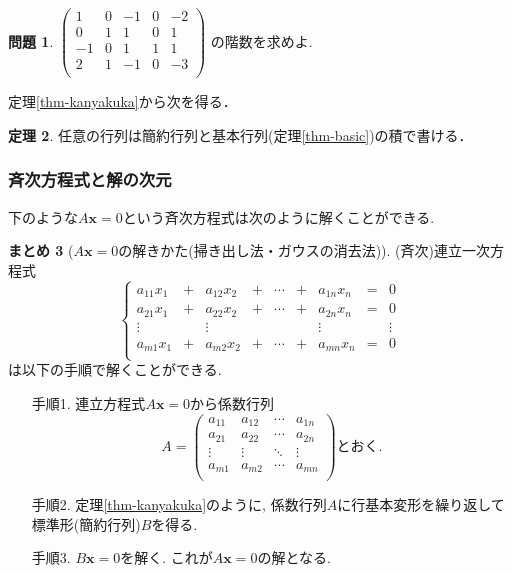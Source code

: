 \documentclass[dvipdfmx,a4paper,11pt]{article}
\theoremstyle{definition}
\newtheorem{thm}{定理}
\newtheorem{ques}[thm]{問題}
\newtheorem{suma}[thm]{まとめ}
\begin{document}
\begin{ques}
$
 \begin{pmatrix}
 1& 0& -1  & 0&-2\\
 0& 1& 1  & 0&1\\
  -1& 0& 1 & 1&1\\
 2& 1& -1 & 0&-3\\
 \end{pmatrix}
 $
 の階数を求めよ.
\end{ques}
定理\ref{thm-kanyakuka}から次を得る．
\begin{tcolorbox}[
    colback = white,
    colframe = green!35!black,
    fonttitle = \bfseries,
    breakable = true]
    \begin{thm}
    任意の行列は簡約行列と基本行列(定理\ref{thm-basic})の積で書ける．
    \end{thm}
 \end{tcolorbox}
\subsubsection{斉次方程式と解の次元}
下のような$A\bm{x} =0$という斉次方程式は次のように解くことができる. 

\begin{tcolorbox}[
    colback = white,
    colframe = green!35!black,
    fonttitle = \bfseries,
    breakable = true]
    \begin{suma}[$A\bm{x} =0$の解きかた(掃き出し法・ガウスの消去法)]
\label{suma-gauss}
(斉次)連立一次方程式
\begin{equation*}
\left\{ 
\begin{matrix}
a_{11}x_1&+& a_{12} x_2& +&\cdots &+&a_{1n}x_n &= &0 \\
a_{21}x_1&+& a_{22} x_2& +&\cdots &+&a_{2n}x_n &= &0 \\
\vdots		&& 	\vdots				 && 		& &\vdots&&\vdots	\\
a_{m1}x_1&+& a_{m2} x_2& +&\cdots &+&a_{mn}x_n &= &0 \\
\end{matrix}
\right.
\end{equation*}
は以下の手順で解くことができる. 
 \begin{enumerate}
 \item[手順1.] 連立方程式$A\bm{x} =0$から係数行列
 $$
 A=\begin{pmatrix}
a_{11}& a_{12} & \cdots &a_{1n} \\
a_{21}& a_{22} & \cdots &a_{2n} \\
\vdots& \vdots	&	\ddots   &	\vdots \\
a_{m1}& a_{m2} & \cdots &a_{mn} \\
\end{pmatrix}
\text{とおく.}
 $$
 \item[手順2.] 定理\ref{thm-kanyakuka}のように, 係数行列$A$に行基本変形を繰り返して標準形(簡約行列)$B$を得る.
 \item[手順3.] $B\bm{x}=0$を解く. これが$A\bm{x} =0$の解となる. 
 \end{enumerate}
 \end{suma}
 \end{tcolorbox}
 
\end{document}
